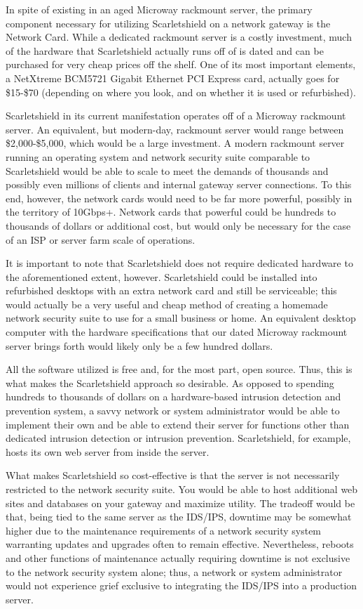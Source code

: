 \documentclass[12pt,letterpaper,titlepage]{report}
\begin{document}
{In spite of existing in an aged Microway rackmount server, the primary component 
necessary for utilizing Scarletshield on a network gateway is the Network Card.  While a 
dedicated rackmount server is a costly investment, much of the hardware that 
Scarletshield actually runs off of is dated and can be purchased for very 
cheap prices off the shelf.  One of its most important elements, a NetXtreme 
BCM5721 Gigabit Ethernet PCI Express card, actually goes for \$15-\$70 (depending 
on where you look, and on whether it is used or refurbished). 

Scarletshield in its current manifestation operates off of a Microway rackmount 
server.  An equivalent, but modern-day, rackmount server would range between 
\$2,000-\$5,000, which would be a large investment. 
A modern rackmount server running an operating system and network security suite
comparable to Scarletshield would be able to scale to meet the demands of
thousands and possibly even millions of clients and internal gateway server
connections.  To this end, however, the network cards would need to be far more
powerful, possibly in the territory of 10Gbps+.  Network cards that powerful
could be hundreds to thousands of dollars or additional cost, but would only be
necessary for the case of an ISP or server farm scale of operations.      

It is
important to note that Scarletshield does not require dedicated hardware to the
aforementioned extent, however.  Scarletshield could be installed into
refurbished desktops with an extra network card and still be serviceable; this
would actually be a very useful and cheap method of creating a homemade network
security suite to use for a small business or home.  An equivalent desktop
computer with the hardware specifications that our dated Microway rackmount
server brings forth would likely only be a few hundred dollars.

All the
software utilized is free and, for the most part, open source.  Thus, this is
what makes the Scarletshield approach so desirable.  As opposed to spending
hundreds to thousands of dollars on a hardware-based intrusion detection and
prevention system, a savvy network or system administrator would be able to
implement their own and be able to extend their server for functions other than
dedicated intrusion detection or intrusion prevention.  Scarletshield, for
example, hosts its own web server from inside the server.       

What makes
Scarletshield so cost-effective is that the server is not necessarily restricted
to the network security suite.  You would be able to host additional web sites
and databases on your gateway and maximize utility.  The tradeoff would be that,
being tied to the same server as the IDS/IPS, downtime may be somewhat higher
due to the maintenance requirements of a network security system warranting
updates and upgrades often to remain effective.  Nevertheless, reboots and other
functions of maintenance actually requiring downtime is not exclusive to the
network security system alone; thus, a network or system administrator would not
experience grief exclusive to integrating the IDS/IPS into a production server.


}
\end{document}
